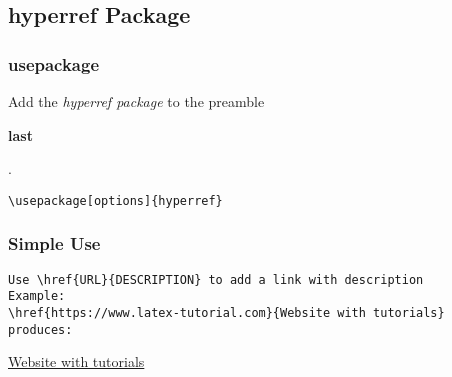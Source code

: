\documentclass{report}
\begin{document}


\subsection{hyperref Package}
\medskip 
\subsubsection{\Large usepackage}

Add the \textit{hyperref package} to the preamble\begin{large}\textbf{ last}\end{large}.	

\begin{verbatim}\usepackage[options]{hyperref}\end{verbatim}

\subsubsection{\Large Simple Use}
\begin{verbatim}Use \href{URL}{DESCRIPTION} to add a link with description
Example:
\href{https://www.latex-tutorial.com}{Website with tutorials}
produces:
\end{verbatim}
\href{https://www.latex-tutorial.com}{Website with tutorials}

	
\end{document}
